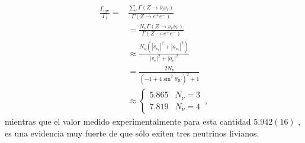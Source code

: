 \begin{align}
  \frac{\Gamma_{\text{inv}}}{\Gamma_l}=&\frac{\sum_l\Gamma(Z\to\bar{\nu}_l\nu_l)}{\Gamma(Z\to e^+ e^-)}\nonumber\\
  &=\frac{N_\nu\Gamma(Z\to\bar{\nu}_e\nu_e)}{\Gamma(Z\to e^+ e^-)}\nonumber\\
  &\approx\frac{N_\nu(|v_{\nu_e}|^2+|a_{\nu_e}|^2)}{|v_{e}|^2+|a_{e}|^2}\nonumber\\
  &=\frac{2N_\nu}{(-1+4\sin^2\theta_W)^2+1}\nonumber\\
  &\approx\begin{cases}
    5.865&N_\nu=3\\
    7.819&N_\nu=4
  \end{cases}\,,
\end{align}
mientras que el valor medido experimentalmente para esta cantidad $5.942(16)$ \cite{a}, es una evidencia muy fuerte de que sólo exiten tres neutrinos livianos. 

